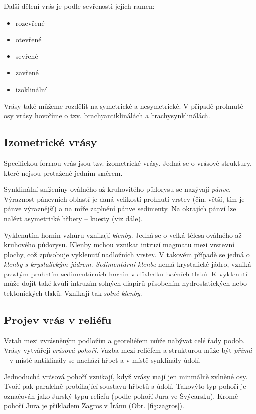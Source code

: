 Další dělení vrás je podle sevřenosti jejich ramen:
\begin{itemize}
	\item rozevřené
	\item otevřené
	\item sevřené
	\item zavřené
	\item izoklinální
\end{itemize}

Vrásy také můžeme rozdělit na symetrické a nesymetrické. V případě prohnuté osy vrásy hovoříme o tzv. brachyantiklinálách a brachysynklinálách.

\subsection{Izometrické vrásy}
Specifickou formou vrás jsou tzv. izometrické vrásy. Jedná se o vrásové struktury, které nejsou protažené jedním směrem. 

Synklinální sníženiny oválného až kruhovitého půdorysu se nazývají \emph{pánve}. Výraznost pánevních oblastí je daná velikostí prohnutí vrstev (čím větší, tím je pánve výraznější) a na míře zaplnění pánve sedimenty. Na okrajích pánví lze nalézt asymetrické hřbety -- kuesty (viz dále). 

Vyklenutím hornin vzhůru vznikají \emph{klenby}. Jedná se o velká tělesa oválného až kruhového půdorysu. Klenby mohou vznikat intruzí magmatu mezi vrstevní plochy, což způsobuje vyklenutí nadložních vrstev. V takovém případě se jedná o \emph{klenby s krystalickým jádrem}. \emph{Sedimentární klenba} nemá krystalické jádro, vzniká prostým prohntím sedimentárních hornin v důsledku bočních tlaků. K vyklenutí může dojít také kvůli intruzím solných diapirů působením hydrostatických nebo tektonických tlaků. Vznikají tak \emph{solné klenby}. 

\subsection{Projev vrás v reliéfu}
Vztah mezi zvrásněným podložím a georeliéfem může nabývat celé řady podob. Vrásy vytvářejí \emph{vrásová pohoří}. Vazba mezi reliéfem a strukturou může být \emph{přímá} -- v místě antiklinály se nachází hřbet a v místě synklinály údolí. 

Jednoduchá vrásová pohoří vznikají, když vrásy mají jen minmálně zvlněné osy. Tvoří pak paralelně probíhající soustavu hřbetů a údolí. Takovýto typ pohoří je označován jako Jurský typu reliéfu (podle pohoří Jura ve Švýcarsku). Kromě pohoří Jura je příkladem Zagros v Íránu (Obr. \ref{fig:zagros}). 

